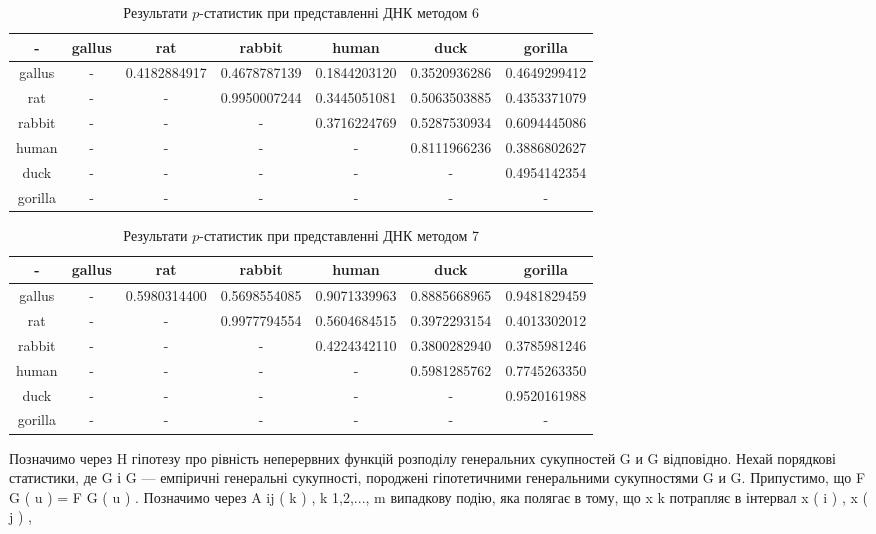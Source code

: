 \documentclass[14pt]{extarticle}
\begin{document}
\begin{table}[h!]
\begin{center}
\begin{tabular}{|c|c|c|c|c|c|c|}
\hline
- & gallus & rat & rabbit & human & duck & gorilla \\ \hline
gallus & - & 0.4182884917 & 0.4678787139 & 0.1844203120 & 0.3520936286 & 0.4649299412 \\ \hline
rat & - & - & 0.9950007244 & 0.3445051081 & 0.5063503885 & 0.4353371079 \\ \hline
rabbit & - & - & - & 0.3716224769 & 0.5287530934 & 0.6094445086 \\ \hline
human & - & - & - & - & 0.8111966236 & 0.3886802627 \\ \hline
duck & - & - & - & - & - & 0.4954142354 \\ \hline
gorilla & - & - & - & - & - & - \\ \hline
\end{tabular}
\end{center}
\caption{Результати $p$-статистик при представленні ДНК методом 6}
\label{table:res6}
\end{table}

\begin{table}[h!]
\begin{center}
\begin{tabular}{|c|c|c|c|c|c|c|}
\hline
- & gallus & rat & rabbit & human & duck & gorilla \\ \hline
gallus & - & 0.5980314400 & 0.5698554085 & 0.9071339963 & 0.8885668965 & 0.9481829459 \\ \hline
rat & - & - & 0.9977794554 & 0.5604684515 & 0.3972293154 & 0.4013302012 \\ \hline
rabbit & - & - & - & 0.4224342110 & 0.3800282940 & 0.3785981246 \\ \hline
human & - & - & - & - & 0.5981285762 & 0.7745263350 \\ \hline
duck & - & - & - & - & - & 0.9520161988 \\ \hline
gorilla & - & - & - & - & - & - \\ \hline
\end{tabular}
\end{center}
\caption{Результати $p$-статистик при представленні ДНК методом 7}
\label{table:res7}
\end{table}


Позначимо через H гіпотезу про рівність неперервних функцій
розподілу  генеральних сукупностей G и G відповідно.
Нехай
порядкові статистики, де G і G  — емпіричні генеральні сукупності,
породжені гіпотетичними генеральними сукупностями G и G.
Припустимо, що F G ( u ) = F G ( u ) . Позначимо через A ij ( k ) , k  1,2,..., m
випадкову подію, яка полягає в тому, що x  k  потрапляє в інтервал  x  ( i ) , x  ( j )  ,
\end{document}

